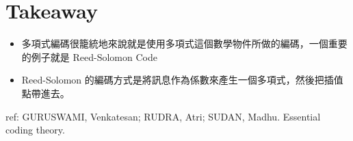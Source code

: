 \documentclass[
]{article}
\providecommand{\tightlist}{%
  \setlength{\itemsep}{0pt}\setlength{\parskip}{0pt}}
\begin{document}
\hypertarget{takeaway}{%
\section{Takeaway}\label{takeaway}}

\begin{itemize}
\tightlist
\item
  多項式編碼很籠統地來說就是使用多項式這個數學物件所做的編碼，一個重要的例子就是
  Reed-Solomon Code
\item
  Reed-Solomon
  的編碼方式是將訊息作為係數來產生一個多項式，然後把插值點帶進去。
\end{itemize}

ref: GURUSWAMI, Venkatesan; RUDRA, Atri; SUDAN, Madhu. Essential coding
theory.
\end{document}
